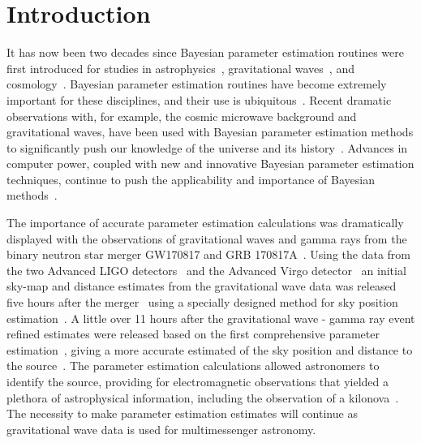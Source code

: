 \documentclass[aps,reprint,amsmath,amssymb,showpacs,showkeys]{revtex4-1}%
\begin{document}



\maketitle

\section{Introduction}

It has now been two decades since Bayesian parameter estimation routines were first introduced for studies in astrophysics~\cite{1994AJ....107.1295S}, gravitational waves~\cite{PhysRevD.58.082001}, and cosmology~\cite{0264-9381-18-14-306,1538-4357-563-2-L95}. Bayesian parameter estimation routines have become extremely important for these disciplines, and their use is ubiquitous~\cite{doi:10.1146/annurev-astro-082214-122339}. 
Recent dramatic observations with, for example, the cosmic microwave background and gravitational waves, have been used with Bayesian parameter estimation methods to significantly push our knowledge of the universe and its history~\cite{0067-0049-208-2-19, Planck2013,Planck2015, PhysRevLett.116.061102,PhysRevLett.116.241102,doi:10.1111/j.1740-9713.2016.00896.x,PhysRevLett.119.161101}. Advances in computer power, coupled with new and innovative Bayesian parameter estimation techniques, continue to push the applicability and importance of Bayesian methods~\cite{doi:10.1093/nsr/nwx044}.

The importance of accurate parameter estimation calculations was dramatically displayed with the observations of gravitational waves and gamma rays from the binary neutron star merger GW170817 and GRB 170817A~\cite{PhysRevLett.119.161101,2041-8205-848-2-L14}. Using the data from the two Advanced LIGO detectors~\cite{0264-9381-32-7-074001} and the Advanced Virgo detector~\cite{0264-9381-32-2-024001} an initial sky-map and distance estimates from the gravitational wave data was released five hours after the merger~\cite{2041-8205-848-2-L12} using a specially designed method for sky position estimation~\cite{PhysRevD.93.024013}. A little over 11 hours after the gravitational wave - gamma ray event refined estimates were released based on the first comprehensive parameter estimation~\cite{Veitch:2015}, giving a more accurate estimated of the sky position and distance to the source~\cite{2041-8205-848-2-L12}. The parameter estimation calculations allowed astronomers to identify the source, providing for electromagnetic observations that yielded a plethora of astrophysical information, including the observation of a kilonova~\cite{2041-8205-848-2-L12}. The necessity to make parameter estimation estimates will continue as gravitational wave data is used for multimessenger astronomy.
\end{document}
